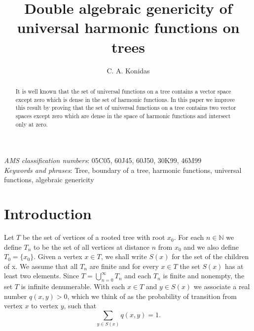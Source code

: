 \documentclass[twoside, 11pt]{article}
\title{\textbf{Double algebraic genericity of universal harmonic functions on trees}}
\author{C. A. Konidas}
\date{\vspace{-5ex}}
\newcommand{\N}{\mathbb{N}}
\theoremstyle{plain}
\theoremstyle{definition}
\begin{document}
%
\pagestyle{myheadings}
%
\maketitle
%
\begin{abstract}
\noindent It is well known that the set of universal functions on a tree contains a vector space except zero which is dense in the set of harmonic functions.
In this paper we improve this result by proving that the set of universal functions on a tree contains two vector spaces except zero which are dense in the space of harmonic functions and intersect only at zero.
\end{abstract}
%
{\em AMS classification numbers}: 05C05, 60J45, 60J50, 30K99, 46M99\smallskip\\
{\em Keywords and phrases}: Tree, boundary of a tree, harmonic functions, universal functions, algebraic genericity
%

\section{Introduction}

Let $T$ be the set of vertices of a rooted tree with root $x_0$.
For each $n \in \N$ we define $T_n$ to be the set of all vertices at distance $n$ from $x_0$ and we also define $T_0 = \{x_0\}$.
Given a vertex $x \in T$, we shall write $S(x)$ for the set of the children of x.
We assume that all $T_n$ are finite and for every $x \in T$ the set $S(x)$ has at least two elements.
Since $T = \bigcup_{n=0}^{\infty}{T_n}$ and each $T_n$ is finite and nonempty, the set $T$ is infinite denumerable.
With each $x \in T$ and $y \in S(x)$ we associate a real number $q(x,y) > 0$, which we think of as the probability of transition from vertex $x$ to vertex $y$, such that
$$\sum_{y \in S(x)}{q(x,y)} = 1.$$
\end{document}
